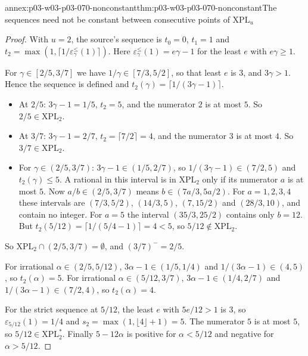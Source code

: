 \begin{annexitem}{annex:p03-w03-p03-070-nonconstant}{thm:p03-w03-p03-070-nonconstant}{The sequences need not be constant between consecutive points of \(\mathrm{XPL}_u\)}
\begin{proof}
With \(u=2\), the source's sequence is \(t_0=0\), \(t_1=1\) and
\(t_2=\max(1,\lceil1/\varepsilon^{\leq}_\gamma(1)\rceil)\).  Here
\(\varepsilon^{\leq}_\gamma(1)=e\gamma-1\) for the least \(e\) with
\(e\gamma\geq1\).

For \(\gamma\in[2/5,3/7]\) we have \(1/\gamma\in[7/3,5/2]\), so that least
\(e\) is \(3\), and \(3\gamma>1\).  Hence the sequence is defined and
\(t_2(\gamma)=\lceil1/(3\gamma-1)\rceil\).
\begin{itemize}
\item At \(2/5\): \(3\gamma-1=1/5\), \(t_2=5\), and the numerator \(2\) is at
      most \(5\).  So \(2/5\in\mathrm{XPL}_2\).
\item At \(3/7\): \(3\gamma-1=2/7\), \(t_2=\lceil7/2\rceil=4\), and the
      numerator \(3\) is at most \(4\).  So \(3/7\in\mathrm{XPL}_2\).
\item For \(\gamma\in(2/5,3/7)\): \(3\gamma-1\in(1/5,2/7)\), so
      \(1/(3\gamma-1)\in(7/2,5)\) and \(t_2(\gamma)\leq5\).  A rational in this
      interval is in \(\mathrm{XPL}_2\) only if its numerator \(a\) is at most
      \(5\).  Now \(a/b\in(2/5,3/7)\) means \(b\in(7a/3,5a/2)\).  For
      \(a=1,2,3,4\) these intervals are \((7/3,5/2)\), \((14/3,5)\),
      \((7,15/2)\) and \((28/3,10)\), and contain no integer.  For \(a=5\) the
      interval \((35/3,25/2)\) contains only \(b=12\).  But
      \(t_2(5/12)=\lceil1/(5/4-1)\rceil=4<5\), so \(5/12\notin\mathrm{XPL}_2\).
\end{itemize}
So \(\mathrm{XPL}_2\cap(2/5,3/7)=\emptyset\), and \((3/7)^-=2/5\).

For irrational \(\alpha\in(2/5,5/12)\), \(3\alpha-1\in(1/5,1/4)\) and
\(1/(3\alpha-1)\in(4,5)\), so \(t_2(\alpha)=5\).  For irrational
\(\alpha\in(5/12,3/7)\), \(3\alpha-1\in(1/4,2/7)\) and
\(1/(3\alpha-1)\in(7/2,4)\), so \(t_2(\alpha)=4\).

For the strict sequence at \(5/12\), the least \(e\) with \(5e/12>1\) is
\(3\), so \(\varepsilon_{5/12}(1)=1/4\) and
\(s_2=\max(1,\lfloor4\rfloor+1)=5\).  The numerator \(5\) is at most \(5\),
so \(5/12\in\mathrm{XPL}^\ast_2\).  Finally \(5-12\alpha\) is positive for
\(\alpha<5/12\) and negative for \(\alpha>5/12\).
\end{proof}
\end{annexitem}

